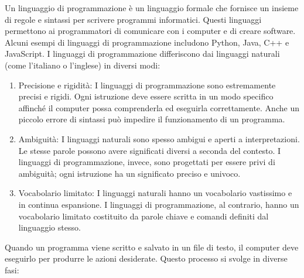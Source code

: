 \documentclass[
  letterpaper,
  DIV=11,
  numbers=noendperiod]{scrreprt}
\providecommand{\tightlist}{%
  \setlength{\itemsep}{0pt}\setlength{\parskip}{0pt}}\usepackage{longtable,booktabs,array}
\begin{document}
Un linguaggio di programmazione è un linguaggio formale che fornisce un
insieme di regole e sintassi per scrivere programmi informatici. Questi
linguaggi permettono ai programmatori di comunicare con i computer e di
creare software. Alcuni esempi di linguaggi di programmazione includono
Python, Java, C++ e JavaScript. I linguaggi di programmazione
differiscono dai linguaggi naturali (come l'italiano o l'inglese) in
diversi modi:

\begin{enumerate}
\def\labelenumi{\arabic{enumi}.}
\tightlist
\item
  Precisione e rigidità: I linguaggi di programmazione sono estremamente
  precisi e rigidi. Ogni istruzione deve essere scritta in un modo
  specifico affinché il computer possa comprenderla ed eseguirla
  correttamente. Anche un piccolo errore di sintassi può impedire il
  funzionamento di un programma.
\item
  Ambiguità: I linguaggi naturali sono spesso ambigui e aperti a
  interpretazioni. Le stesse parole possono avere significati diversi a
  seconda del contesto. I linguaggi di programmazione, invece, sono
  progettati per essere privi di ambiguità; ogni istruzione ha un
  significato preciso e univoco.
\item
  Vocabolario limitato: I linguaggi naturali hanno un vocabolario
  vastissimo e in continua espansione. I linguaggi di programmazione, al
  contrario, hanno un vocabolario limitato costituito da parole chiave e
  comandi definiti dal linguaggio stesso.
\end{enumerate}

Quando un programma viene scritto e salvato in un file di testo, il
computer deve eseguirlo per produrre le azioni desiderate. Questo
processo si svolge in diverse fasi:
\end{document}
